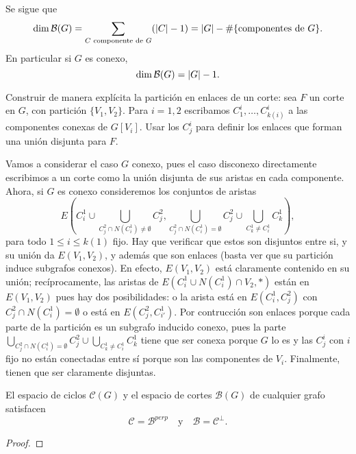 \documentclass[../main.tex]{subfiles}
\begin{document}
\begin{corollary}
Se sigue que
$$
\dim \mathcal{B} (G) = \sum_{C \text{ componente de $G$}} (\left \vert C \right \vert -1) = \left \vert G \right \vert -  \# \{\text{componentes de $G$}\}.
$$
En particular si $G$ es conexo,
\[
    \dim \mathcal{B} (G) = \left \vert G \right \vert -1.
\]
\end{corollary}

\begin{exercise}
Construir de manera explícita la partición en enlaces de un corte: sea $F$ un corte en $G$, con partición $\{V_1, V_2\}$. Para $i = 1,2$ escribamos $C_1^i, \ldots, C^i_{k(i)}$ a las componentes conexas de $G[V_i]$. Usar los $C_j^i$ para definir los enlaces que forman una unión disjunta para $F$.
\end{exercise}
\begin{solution}
Vamos a considerar el caso $G$ conexo, pues el caso disconexo directamente escribimos a un corte como la unión disjunta de sus aristas en cada componente. Ahora, si $G$ es conexo consideremos los conjuntos de aristas
$$
E(C_i^1 \cup \bigcup_{C_j^2 \cap N (C_i^1) \neq \emptyset} C_j^2, \bigcup_{C_j^2 \cap N(C_i^1) = \emptyset} C_j^2 \cup \bigcup_{C_k^1 \neq C_i^1} C_{k}^1),
$$
para todo $1 \leq i \leq k(1)$ fijo. Hay que verificar que estos son disjuntos entre si, y su unión da $E(V_1,V_2)$, y además que son enlaces (basta ver que su partición induce subgrafos conexos). En efecto, $E(V_1,V_2)$ está claramente contenido en su unión; recíprocamente, las aristas de $E(C_i^1 \cup N (C_i^1)\cap V_2, *)$ están en $E(V_1,V_2)$ pues hay dos posibilidades: o la arista está en $E(C_i^1, C_j^2)$ con $C_j^2 \cap N (C_i^1) = \emptyset$ o está en $E(C_j^2,C_{i'}^1)$. Por contrucción son enlaces porque cada parte de la partición es un subgrafo inducido conexo, pues la parte $\bigcup_{C_j^2 \cap N(C_i^1) = \emptyset} C_j^2 \cup \bigcup_{C_k^1 \neq C_i^1} C_{k}^1$ tiene que ser conexa porque $G$ lo es y las $C_j^i$ con $i$ fijo no están conectadas entre sí porque son las componentes de $V_i$. Finalmente, tienen que ser claramente disjuntas.
\end{solution}

\begin{theorem}
El espacio de ciclos $\mathcal{C}(G)$ y el espacio de cortes $\mathcal{B}(G)$ de cualquier grafo satisfacen
\[
    \mathcal C = \mathcal B^{perp} \quad \text{y} \quad \mathcal B = \mathcal C^{\perp}.
\]
\end{theorem}
\begin{proof}

\end{proof}
\end{document}
